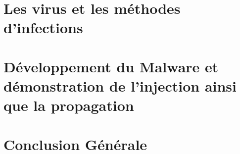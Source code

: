 \documentclass[12pt]{report}
\begin{document}
\chapter{Les virus et les méthodes d'infections}


\chapter[Développement, Injection, Propagation]{Développement du Malware et démonstration de l'injection ainsi que la propagation}


\chapter*{Conclusion Générale}


\appendix



\end{document}
